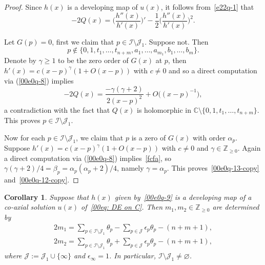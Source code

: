 \documentclass[10pt,a4paper]{amsart}
\numberwithin{equation}{section}
\newtheorem{Corollary}[Theorem]{Corollary}
\def\C{\mathbb C}
\begin{document}
\begin{proof} Since $h(x)$ is a developing map of $u(x)$, it follows from~\eqref{e22q-1} that
\begin{equation}
\label{00e0q-8}-2Q(x)=\biggl(\frac{h''(x)}{h'(x)}\biggr)'-\frac12 \biggl(\frac{h''(x)}{h'(x)}\biggr)^2.
\end{equation}

Let $G(p)=0$, first we claim that $p\in\mathcal{I}\setminus \mathcal{J}_1$.
Suppose not. Then
\[
 p\notin\{0,1,t_1,\dots,t_{n+m}, a_1,\dots, a_{m_1}, b_1,\dots,
 b_m\}.
\]
Denote by $\gamma\geq 1$ to be the zero order of $G(x)$ at $p$, then $h'(x)=c(x-p)^\gamma(1+O(x-p))$ with $c\neq 0$ and so a direct computation via (\ref{00e0q-8}) implies
\begin{equation}\label{fcfa}-2Q(x)=\frac{-\gamma (\gamma+2)}{2(x-p)^2}+O\bigl((x-p)^{-1}\bigr),\end{equation}
a contradiction with the fact that $Q(x)$ is holomorphic in $\C\setminus\{0,1,t_1,\dots, t_{n+m}\}$. This proves $p\in\mathcal{I}\setminus \mathcal{J}_1$.

Now for each $p\in\mathcal{I}\setminus \mathcal{J}_1$,
we claim that $p$ is a zero of $G(x)$ with order $\alpha_{p}$.
Suppose $h'(x)=c(x-p)^\gamma(1+O(x-p))$ with $c\neq 0$ and
$\gamma\in\mathbb{Z}_{\geq 0}$. Again a direct computation via
(\ref{00e0q-8}) implies~\eqref{fcfa},
so $\gamma(\gamma+2)/4=\beta_{p}=\alpha_{p}(\alpha_{p}+2)/4$, namely
$\gamma=\alpha_{p}$. %
This proves~\eqref{00e0q-13-copy} and~\eqref{00e0q-12-copy}.
\end{proof}

\begin{Corollary}%
Suppose that $h(x)$ given by~\eqref{00e0q-9} is a developing map of a
co-axial solution $u(x)$ of~\eqref{00eq: DE on C}. Then $m_1,
m_2\in\mathbb{Z}_{\geq 0}$ are determined by
\begin{gather}\label{m1}
2m_1=\sum_{p\in\mathcal{I}\setminus \mathcal{J}_1}\theta_p-\sum_{p\in\mathcal{J}}\epsilon_p\theta_p-(n+m+1),
\\ \label{m2}
2m_2=\sum_{p\in\mathcal{I}\setminus \mathcal{J}_1}\theta_p+\sum_{p\in\mathcal{J}}\epsilon_p\theta_p-(n+m+1),
\end{gather}
where $\mathcal{J}:=\mathcal{J}_1\cup\{\infty\}$ and $\epsilon_\infty=1$. In particular, $\mathcal{I}\setminus\mathcal{J}_1\neq \varnothing$.
\end{Corollary}
\end{document}
